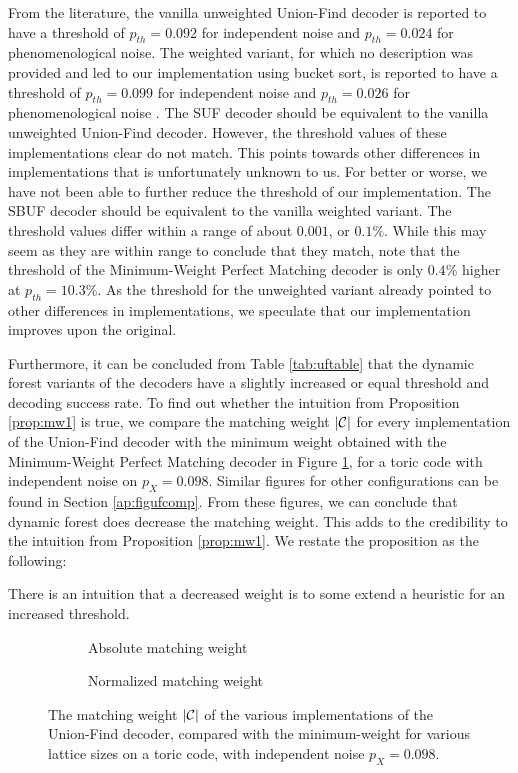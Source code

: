 From the literature, the vanilla unweighted Union-Find decoder is reported to have a threshold of $p_{th}=0.092$ for independent noise and $p_{th}=0.024$ for phenomenological noise. The weighted variant, for which no description was provided and led to our implementation using bucket sort, is reported to have a threshold of $p_{th}=0.099$ for independent noise and $p_{th}=0.026$ for phenomenological noise \cite{delfosse2017almost}. The SUF decoder should be equivalent to the vanilla unweighted Union-Find decoder. However, the threshold values of these implementations clear do not match. This points towards other differences in implementations that is unfortunately unknown to us. For better or worse, we have not been able to further reduce the threshold of our implementation. 
The SBUF decoder should be equivalent to the vanilla weighted variant. The threshold values differ within a range of about $0.001$, or $0.1\%$. While this may seem as they are within range to conclude that they match, note that the threshold of the Minimum-Weight Perfect Matching decoder is only $0.4\%$ higher at $p_{th}=10.3\%$. As the threshold for the unweighted variant already pointed to other differences in implementations, we speculate that our implementation improves upon the original. 

Furthermore, it can be concluded from Table \ref{tab:uftable} that the dynamic forest variants of the decoders have a slightly increased or equal threshold and decoding success rate. To find out whether the intuition from Proposition \ref{prop:mw1} is true, we compare the matching weight $|\mathcal{C}|$ for every implementation of the Union-Find decoder with the minimum weight obtained with the Minimum-Weight Perfect Matching decoder in Figure \ref{fig:mwcomp_uf_toric_2d}, for a toric code with independent noise on $p_X=0.098$. Similar figures for other configurations can be found in Section \ref{ap:figufcomp}. From these figures, we can conclude that dynamic forest does decrease the matching weight. This adds to the credibility to the intuition from Proposition \ref{prop:mw1}. We restate the proposition as the following:
\begin{proposition}\label{prop:mw2}
  There is an intuition that a decreased weight is to some extend a heuristic for an increased threshold. 
\end{proposition}

\begin{figure}[htbp]
  \centering
  \begin{subfigure}[t]{0.49\textwidth}
      
      \caption{Absolute matching weight}
  \end{subfigure}
  \begin{subfigure}[t]{0.49\textwidth}
      
      \caption{Normalized matching weight}
  \end{subfigure}
  \caption{The matching weight $|\mathcal{C}|$ of the various implementations of the Union-Find decoder, compared with the minimum-weight for various lattice sizes on a toric code, with independent noise $p_X=0.098$.}
  \label{fig:mwcomp_uf_toric_2d}
\end{figure}

